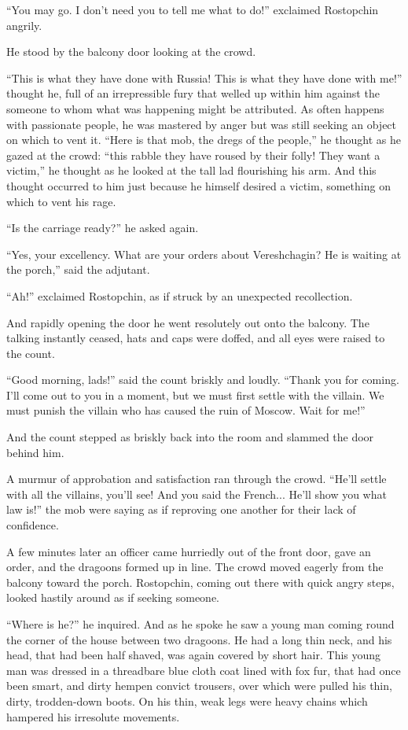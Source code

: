 ``You may go. I don't need you to tell me what to do!'' exclaimed
Rostopchin angrily.

He stood by the balcony door looking at the crowd.

``This is what they have done with Russia! This is what they have
done with me!'' thought he, full of an irrepressible fury that
welled up within him against the someone to whom what was
happening might be attributed. As often happens with passionate
people, he was mastered by anger but was still seeking an object
on which to vent it. ``Here is that mob, the dregs of the
people,'' he thought as he gazed at the crowd: ``this rabble they
have roused by their folly! They want a victim,'' he thought as
he looked at the tall lad flourishing his arm. And this thought
occurred to him just because he himself desired a victim,
something on which to vent his rage.

``Is the carriage ready?'' he asked again.

``Yes, your excellency. What are your orders about Vereshchagin?
He is waiting at the porch,'' said the adjutant.

``Ah!'' exclaimed Rostopchin, as if struck by an unexpected
recollection.

And rapidly opening the door he went resolutely out onto the
balcony.  The talking instantly ceased, hats and caps were
doffed, and all eyes were raised to the count.

``Good morning, lads!'' said the count briskly and
loudly. ``Thank you for coming. I'll come out to you in a moment,
but we must first settle with the villain. We must punish the
villain who has caused the ruin of Moscow. Wait for me!''

And the count stepped as briskly back into the room and slammed
the door behind him.

A murmur of approbation and satisfaction ran through the
crowd. ``He'll settle with all the villains, you'll see! And you
said the French...  He'll show you what law is!'' the mob were
saying as if reproving one another for their lack of confidence.

A few minutes later an officer came hurriedly out of the front
door, gave an order, and the dragoons formed up in line. The
crowd moved eagerly from the balcony toward the
porch. Rostopchin, coming out there with quick angry steps,
looked hastily around as if seeking someone.

``Where is he?'' he inquired. And as he spoke he saw a young man
coming round the corner of the house between two dragoons. He had
a long thin neck, and his head, that had been half shaved, was
again covered by short hair. This young man was dressed in a
threadbare blue cloth coat lined with fox fur, that had once been
smart, and dirty hempen convict trousers, over which were pulled
his thin, dirty, trodden-down boots. On his thin, weak legs were
heavy chains which hampered his irresolute movements.

